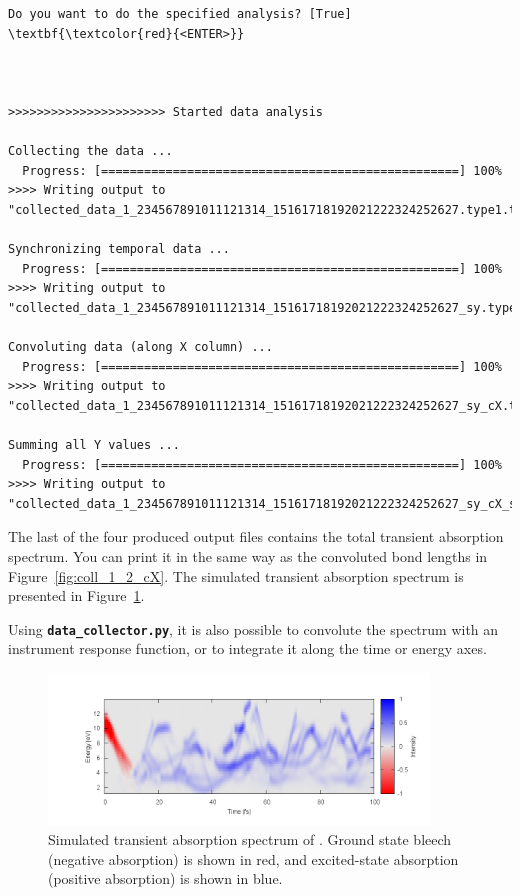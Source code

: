 \documentclass[a4paper,11pt,DIV=15,openany]{scrbook}
\newcommand{\ttt}[1]{\textbf{\texttt{#1}}}
\begin{document}
\begin{oframed}
\begin{Verbatim}[commandchars=\\\{\}]
Do you want to do the specified analysis? [True] \textbf{\textcolor{red}{<ENTER>}}



>>>>>>>>>>>>>>>>>>>>>> Started data analysis

Collecting the data ...
  Progress: [==================================================] 100%
>>>> Writing output to "collected_data_1_234567891011121314_15161718192021222324252627.type1.txt"...

Synchronizing temporal data ...
  Progress: [==================================================] 100%
>>>> Writing output to "collected_data_1_234567891011121314_15161718192021222324252627_sy.type2.txt"...

Convoluting data (along X column) ...
  Progress: [==================================================] 100%
>>>> Writing output to "collected_data_1_234567891011121314_15161718192021222324252627_sy_cX.type3.txt"...

Summing all Y values ...
  Progress: [==================================================] 100%
>>>> Writing output to "collected_data_1_234567891011121314_15161718192021222324252627_sy_cX_sY.type3.txt"...

\end{Verbatim}
\end{oframed}

\normalsize
The last of the four produced output files contains the total transient absorption spectrum.
You can print it in the same way as the convoluted bond lengths in Figure~\ref{fig:coll_1_2_cX}.
The simulated transient absorption spectrum is presented in Figure~\ref{fig:TAS}.

Using \ttt{data\_collector.py}, it is also possible to convolute the spectrum with an instrument response function, or to integrate it along the time or energy axes.

\begin{figure}[ptb]
  \centering
  \includegraphics[width=0.9\textwidth]{figures/TAS.png}
  \caption{Simulated transient absorption spectrum of . Ground state bleech (negative absorption) is shown in red, and excited-state absorption (positive absorption) is shown in blue.}
  \label{fig:TAS}
\end{figure}
\end{document}
